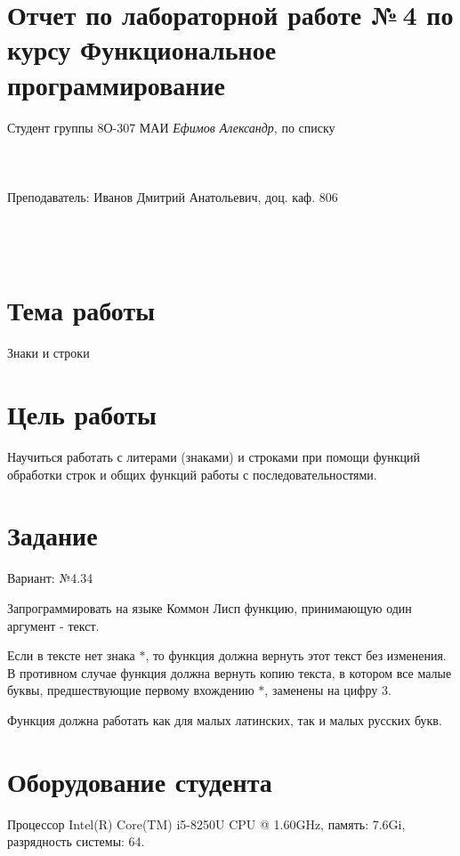 \documentclass[12pt]{article}
\begin{document}
\section*{Отчет по лабораторной работе №\,4 
по курсу \guillemotleft  Функциональное программирование\guillemotright}
\begin{flushright}
Студент группы 8О-307 МАИ \textit{Ефимов Александр},  по списку \\
 \\
 \\
\ \\
Преподаватель: Иванов Дмитрий Анатольевич, доц. каф. 806 \\
 \\
 \\
 \\

\end{flushright}

\section{Тема работы}
Знаки и строки

\section{Цель работы}
Научиться работать с литерами (знаками) и строками при помощи функций 
обработки строк и общих функций работы с последовательностями.

\section{Задание}

Вариант: №4.34

Запрограммировать на языке Коммон Лисп функцию, принимающую один аргумент - 
текст.

Если в тексте нет знака $*$, то функция должна вернуть этот текст без изменения. 
В противном случае функция должна вернуть копию текста, в котором все малые 
буквы, предшествующие первому вхождению $*$, заменены на цифру 3.

Функция должна работать как для малых латинских, так и малых русских букв.

\section{Оборудование студента}
Процессор Intel(R) Core(TM) i5-8250U CPU @ 1.60GHz, память: 7.6Gi, разрядность 
системы: 64.
\end{document}
